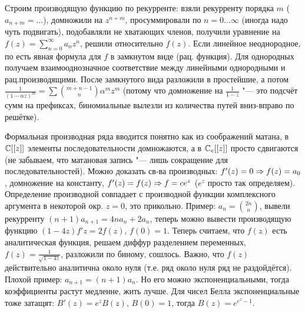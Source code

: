 \section{} %
Строим производящую функцию по рекурренте: взяли рекурренту порядка $m$ ($a_{n+m}=\dots$), домножили на $z^{n+m}$, просуммировали по $n=0\dots\infty$
(иногда надо чуть подвигать), подобавляли не хватающих членов, получили уравнение на $f(z)=\sum_{n=0}^\infty a_nz^n$, решили
относительно $f(z)$.
Если линейное неоднородное, по есть явная формула для $f$ в замкнутом виде (рац. функция).
Для однородных получаем взаимооднозначное соответствие между линейными однородными и рац.производящими.
После замкнутого вида разложили в простейшие, а потом $\frac{1}{(1-\alpha z)^m}=\sum \binom{m+n-1}{n} \alpha^m z^m$ (потому что домножение
на $\frac{1}{1-z}$ "--- это подсчёт сумм на префиксах, биномиальные вылезли из количества путей вниз-вправо по решётке).

Формальная производная ряда вводится понятно как из соображений матана, в $\mathbb{C}[[z]]$ элементы последовательности домножаются, а в $\mathbb{C}_e[[z]]$ просто сдвигаются
(не забываем, что матановая запись "--- лишь сокращение для последовательностей).
Можно доказать св-ва производных: $f'(z)=0 \Rightarrow f(z)=a_0$, домножение на константу, $f'(z)=f(z) \Rightarrow f=ce^z$ ($e^z$ просто так определяем).
Определение производной совпадает с производной функции комплексного аргумента в некоторой окр. $z=0$, это прикольно.
Пример: $a_n=\binom{2n}{n}$, вывели рекурренту $(n+1)a_{n+1}=4na_n+2a_n$, теперь можно вывести производящую функцию $(1-4z)f'z=2f(z)$, $f(0)=1$.
Теперь считаем, что $f(z)$ есть аналитическая функция, решаем диффур разделением переменных, $f(z)=\frac{1}{\sqrt{1-4z}}$, разложили по биному,
сошлось.
Важно, что $f(z)$ действительно аналитична около нуля (т.е. ряд около нуля ряд не раздойдётся).
Плохой пример: $a_{n+1}=(n+1)a_n$.
Но его можно экспоненциальными, тогда коэффициенты растут медленне, жить лучше.
Для чисел Белла экспоненциальные тоже затащят: $B'(z)=e^zB(z)$, $B(0)=1$, тогда $B(z)=e^{e^z-1}$.
